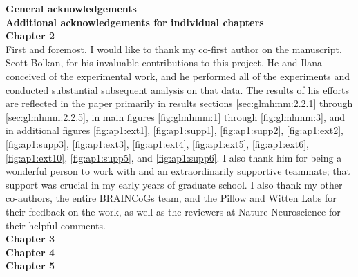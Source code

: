 {\large \textbf{General acknowledgements}} \\
{\large \textbf{Additional acknowledgements for individual chapters}}\\
\textbf{Chapter 2} \\
First and foremost, I would like to thank my co-first author on the manuscript, Scott Bolkan, for his invaluable contributions to this project. He and Ilana conceived of the experimental work, and he performed all of the experiments and conducted substantial subsequent analysis on that data. The results of his efforts are reflected in the paper primarily in results sections \ref{sec:glmhmm:2.2.1} through \ref{sec:glmhmm:2.2.5}, in main figures \ref{fig:glmhmm:1} through \ref{fig:glmhmm:3}, and in additional figures \ref{fig:ap1:ext1}, \ref{fig:ap1:supp1}, \ref{fig:ap1:supp2}, \ref{fig:ap1:ext2}, \ref{fig:ap1:supp3}, \ref{fig:ap1:ext3}, \ref{fig:ap1:ext4}, \ref{fig:ap1:ext5}, \ref{fig:ap1:ext6}, \ref{fig:ap1:ext10}, \ref{fig:ap1:supp5}, and \ref{fig:ap1:supp6}. I also thank him for being a wonderful person to work with and an extraordinarily supportive teammate; that support was crucial in my early years of graduate school. I also thank my other co-authors, the entire BRAINCoGs team, and the Pillow and Witten Labs for their feedback on the work, as well as the reviewers at Nature Neuroscience for their helpful comments. \\
\textbf{Chapter 3} \\
\textbf{Chapter 4} \\
\textbf{Chapter 5} \\